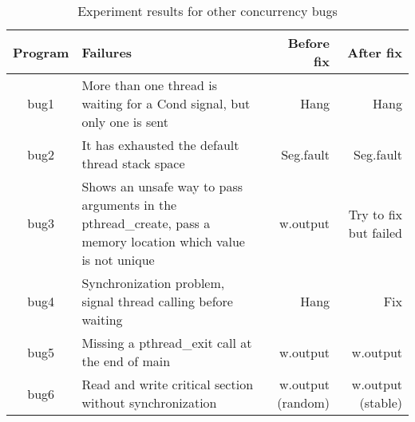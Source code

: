 \begin{table*}[htbp]
  \centering
\begin{tabular}{|c|p{7cm}|r|r|} \hline
  Program & Failures & Before fix & After fix \\ \hline
  bug1 & More than one thread is waiting for a Cond signal, but only one is sent & Hang & Hang \\ \hline
  bug2 & It has exhausted the default thread stack space & Seg.fault & Seg.fault \\ \hline
  bug3 & Shows an unsafe way to pass arguments in the pthread\_create, pass a memory location which value is not unique & w.output & Try to fix but failed \\ \hline
  bug4 & Synchronization problem,  signal thread calling before waiting & Hang & Fix \\ \hline
  bug5 & Missing a pthread\_exit call at the end of main & w.output & w.output \\ \hline
  bug6 & Read and write critical section without synchronization & w.output (random) & w.output (stable) \\ \hline
\end{tabular}%
\caption{Experiment results for other concurrency bugs}
\label{tab:other}%
\end{table*}%
